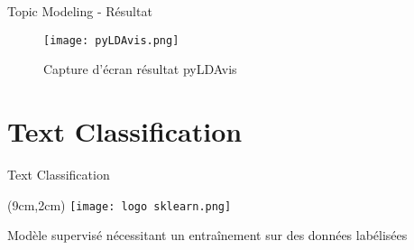 \documentclass[10pt,sans,usenames,dvipsnames,english,compress]{beamer}
\begin{document}
\begin{frame}{Topic Modeling - Résultat}
    \begin{figure}[!h]
    \centering
    \texttt{[image: pyLDAvis.png]}
    \caption{Capture d'écran résultat pyLDAvis}
    \end{figure}
\end{frame}

\section{Text Classification}
\begin{frame}{Text Classification}
	\begin{textblock*}{3cm}(9cm,2cm)
		\texttt{[image: logo sklearn.png]}
	\end{textblock*}

	\vspace{1cm}

	\begin{block}{}
		Modèle supervisé nécessitant un entraînement sur des données labélisées
	\end{block}

        \vspace{0.5cm}

\end{frame}
\end{document}
